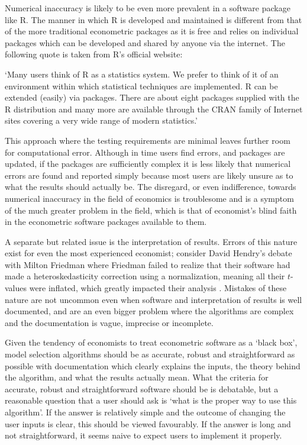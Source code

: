 Numerical inaccuracy is likely to be even more prevalent in a software package like R. The manner in which R is developed and maintained is different from that of the more traditional econometric packages as it is free and relies on individual packages which can be developed and shared by anyone via the internet. The following quote is taken from R's official website:
\begin{displayquote}
`Many users think of R as a statistics system. We prefer to think of it of an environment within which statistical techniques are implemented. R can be extended (easily) via packages. There are about eight packages supplied with the R distribution and many more are available through the CRAN family of Internet sites covering a very wide range of modern statistics.'
\end{displayquote}
This approach where the testing requirements are minimal leaves further room for computational error. Although in time users find errors, and packages are updated, if the packages are sufficiently complex it is less likely that numerical errors are found and reported simply because most users are likely unsure as to what the results should actually be.  The disregard, or even indifference, towards numerical inaccuracy in the field of economics is troublesome and is a symptom of the much greater problem in the field, which is that of economist's blind faith in the econometric software packages available to them. 

A separate but related issue is the interpretation of results. Errors of this nature exist for even the most experienced economist; consider David Hendry's debate with Milton Friedman where Friedman failed to realize that their software had made a heteroskedasticity correction using a normalization, meaning all their $t$-values were inflated, which greatly impacted their analysis \cite{EricDFHSH14MF}. Mistakes of these nature are not uncommon even when software and interpretation of results is well documented, and are an even bigger problem where the algorithms are complex and the documentation is vague, imprecise or incomplete.  

Given the tendency of economists to treat econometric software as a `black box', model selection algorithms should be as accurate, robust and straightforward as possible with documentation which clearly explains the inputs, the theory behind the algorithm, and what the results actually mean. What the criteria for accurate, robust and straightforward software should be is debatable, but a reasonable question that a user should ask is `what is the proper way to use this algorithm'. If the answer is relatively simple and the outcome of changing the user inputs is clear, this should be viewed favourably. If the answer is long and not straightforward, it seems naive to expect users to implement it properly.

